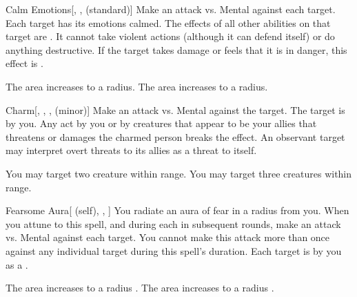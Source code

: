 \lowercase{\hypertarget{spell:Calm Emotions}{}}\label{spell:Calm Emotions}
\begin{freeability}[Rank 3]{\hypertarget{spell:Calm Emotions}{Calm Emotions}}[, ,  (standard)]
Make an attack vs. Mental against each target.
\hit Each target has its emotions calmed.
The effects of all other  abilities on that target are .
It cannot take violent actions (although it can defend itself) or do anything destructive.
If the target takes damage or feels that it is in danger, this effect is .

\rankline
{} The area increases to a \areahuge radius.
 The area increases to a \areaext radius.
\end{freeability}
\vspace{0.25em}



\lowercase{\hypertarget{spell:Charm}{}}\label{spell:Charm}
\begin{freeability}[Rank 3]{\hypertarget{spell:Charm}{Charm}}[, , ,  (minor)]
Make an attack vs. Mental against the target.
\hit The target is \charmed by you.
Any act by you or by creatures that appear to be your allies that threatens or damages the charmed person breaks the effect.
An observant target may interpret overt threats to its allies as a threat to itself.

\rankline
{} You may target two creature within range.
 You may target three creatures within range.
\end{freeability}
\vspace{0.25em}



\lowercase{\hypertarget{spell:Fearsome Aura}{}}\label{spell:Fearsome Aura}
\begin{attuneability}[Rank 3]{\hypertarget{spell:Fearsome Aura}{Fearsome Aura}}[ (self), , ]
You radiate an aura of fear in a \areamed radius  from you.
When you attune to this spell, and during each  in subsequent rounds, make an attack vs. Mental against each target.
You cannot make this attack more than once against any individual target during this spell's duration.
\hit Each target is  by you as a .

\rankline
{} The area increases to a \arealarge radius .
 The area increases to a \areahuge radius .
\end{attuneability}
\vspace{0.25em}



